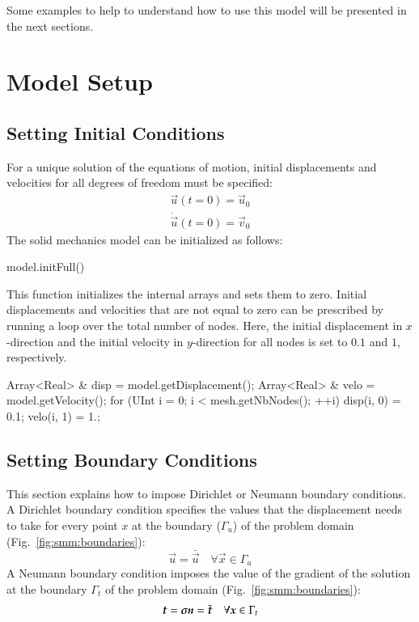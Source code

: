 Some examples to help to understand how to use this model will be
presented in the next sections.

\section{Model Setup}


\subsection{Setting Initial Conditions \label{sect:smm:initial_condition}}

For a unique solution of the equations of motion, initial
displacements and velocities for all degrees of freedom must be
specified:
\begin{eqnarray}
  \vec{u}(t=0) = \vec{u}_0\\
  \dot{\vec u}(t=0) =\vec{v}_0
\end{eqnarray} The solid mechanics model can be initialized as
follows:
\begin{cpp}
  model.initFull()
\end{cpp}
This function initializes the internal arrays and sets them to
zero. Initial displacements and velocities that are not equal to zero
can be prescribed by running a loop over the total number of
nodes. Here, the initial displacement in $x$-direction and the
initial velocity in $y$-direction for all nodes is set to $0.1$ and $1$,
respectively.
\begin{cpp}
Array<Real> & disp = model.getDisplacement();
Array<Real> & velo = model.getVelocity();
for (UInt i = 0; i < mesh.getNbNodes(); ++i) {
  disp(i, 0) = 0.1;
  velo(i, 1) = 1.;
}
\end{cpp}

\subsection{Setting Boundary Conditions\label{sect:smm:boundary}}
This section explains how to impose Dirichlet or Neumann boundary
conditions. A Dirichlet boundary condition specifies the values that
the displacement needs to take for every point $x$ at the boundary
($\Gamma_u$) of the problem domain (Fig.~\ref{fig:smm:boundaries}):
\begin{equation}
  \vec{u} = \bar{\vec u} \quad \forall \vec{x}\in
  \Gamma_{u}
\end{equation}
A Neumann boundary condition imposes the value of the gradient of the
solution at the boundary $\Gamma_t$ of the problem domain
(Fig.~\ref{fig:smm:boundaries}):
\begin{equation}
  \boldsymbol{t} = \boldsymbol{\sigma} \boldsymbol{n} = \bar{\boldsymbol{t}} \quad
  \forall \boldsymbol{x}\in \Gamma_{t}
\end{equation}

